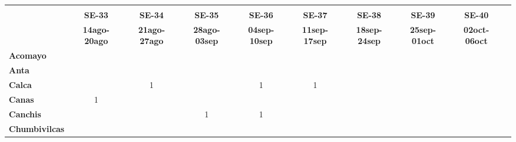 \begin{tabular}{lccccccccc}
	\textbf{}              	  
	& \multicolumn{1}{l}{}                        
	& \multicolumn{1}{l}{}      
	& \multicolumn{1}{l}{}                         
	& \multicolumn{1}{l}{}                         
	& \multicolumn{1}{l}{}                         
	& \multicolumn{1}{l}{}                        
	& \multicolumn{1}{l}{}                         
	& \multicolumn{1}{l}{} \\                   
	\textbf{}                                                                 				
	&\textbf{SE-33}								
	&\textbf{SE-34}					
	&\textbf{SE-35}								
	&\textbf{SE-36}
	&\textbf{SE-37}
	&\textbf{SE-38}
	&\textbf{SE-39}
	&\textbf{SE-40}\\							
	\textbf{}              	  															
	&\textbf{14ago-20ago}						
	&\textbf{21ago-27ago}						
	&\textbf{28ago-03sep}
	&\textbf{04sep-10sep}
	&\textbf{11sep-17sep} 
	&\textbf{18sep-24sep} 
	&\textbf{25sep-01oct}
	&\textbf{02oct-06oct}\\
	\textbf{Acomayo}                        												
	&\cellcolor[HTML]{FCC46C}
	&\cellcolor[HTML]{FCC46C}					
	&\cellcolor[HTML]{FCC46C}
	&\cellcolor[HTML]{FCC46C}					
	&\cellcolor[HTML]{FCC46C}
	&\cellcolor[HTML]{FCC46C} 
	&\cellcolor[HTML]{FCC46C}
	&\cellcolor[HTML]{FCC46C}\\
	\textbf{Anta}                                                  							&\cellcolor[HTML]{FCC46C}						
	&\cellcolor[HTML]{FCC46C}					
	&\cellcolor[HTML]{FCC46C}					
	&\cellcolor[HTML]{FCC46C}					
	&\cellcolor[HTML]{FCC46C}
	&\cellcolor[HTML]{FCC46C}	
	&\cellcolor[HTML]{FCC46C}
	&\cellcolor[HTML]{FCC46C}\\					
	\textbf{Calca} 	
	&\cellcolor[HTML]{FCC46C}					
	&1											
	&\cellcolor[HTML]{FCC46C}
	&1
	&1
	&\cellcolor[HTML]{FCC46C}
	&\cellcolor[HTML]{FCC46C}
	&\cellcolor[HTML]{FCC46C}\\          			
	\textbf{Canas}     			
	&1
	&\cellcolor[HTML]{FCC46C}					
	&\cellcolor[HTML]{FCC46C}
	&\cellcolor[HTML]{FCC46C}	
	&\cellcolor[HTML]{FCC46C}
	&\cellcolor[HTML]{FCC46C}
	&\cellcolor[HTML]{FCC46C}
	&\cellcolor[HTML]{FCC46C}\\	
	\textbf{Canchis}   	
	&\cellcolor[HTML]{FCC46C}			
	&\cellcolor[HTML]{FCC46C}					
	&1
	&1
	&\cellcolor[HTML]{FCC46C}
	&\cellcolor[HTML]{FCC46C}
	&\cellcolor[HTML]{FCC46C}
	&\cellcolor[HTML]{FCC46C}\\											
	\textbf{Chumbivilcas}                      									
	&\cellcolor[HTML]{FCC46C}
	&\cellcolor[HTML]{FCC46C}					

\end{tabular}
